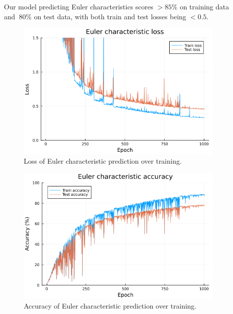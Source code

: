 \documentclass[final,20pt]{beamer}
\newlength{\sepwidth}
\newlength{\colwidth}
\newcommand{\separatorcolumn}{\begin{column}{\sepwidth}\end{column}}
\begin{document}
\begin{frame}[t, fragile]
\begin{columns}[t]
\begin{column}{\colwidth}
\end{column}

\separatorcolumn

\begin{column}{\colwidth}
  \begin{block}

    Our model predicting Euler characteristics scores
    $>85\%$ on training data and $~80\%$ on test data,
    with both train and test losses being $<0.5$.

    \begin{figure}
    \includegraphics{chi-loss.png}
    \caption{Loss of Euler characteristic prediction over training.}
    \end{figure}

    \begin{figure}
    \includegraphics{chi-accuracy.png}
    \caption{Accuracy of Euler characteristic prediction over training.}
    \end{figure}


\end{block}
\end{column}
\end{columns}
\end{frame}
\end{document}
